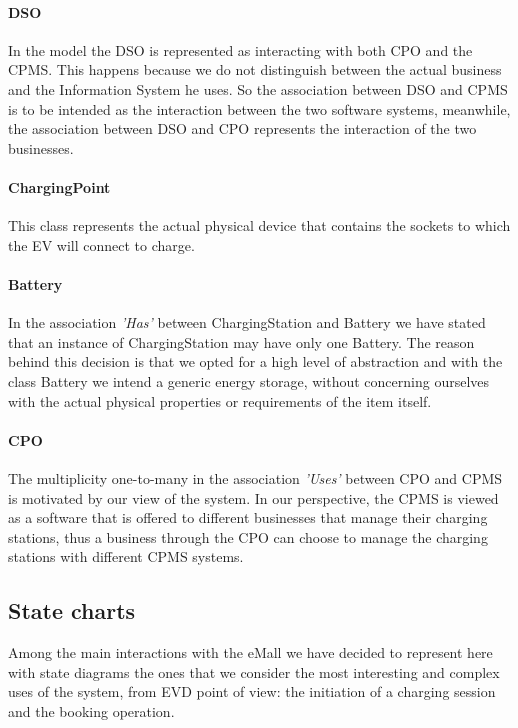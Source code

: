 \paragraph{DSO}
In the model the DSO is represented as interacting with both CPO and the CPMS. This happens because we do not distinguish between the actual business and the Information System he uses. So the association between DSO and CPMS is to be intended as the interaction between the two software systems, meanwhile, the association between DSO and CPO represents the interaction of the two businesses.

\paragraph{ChargingPoint}
This class represents the actual physical device that contains the sockets to which the EV will connect to charge.

\paragraph{Battery} In the association \textit{'Has'} between ChargingStation and Battery we have stated that an instance of ChargingStation may have only one Battery. The reason behind this decision is that we opted for a high level of abstraction and with the class Battery we intend a generic energy storage, without concerning ourselves with the actual physical properties or requirements of the item itself.

\paragraph{CPO} The multiplicity one-to-many in the association \textit{'Uses'} between CPO and CPMS is motivated by our view of the system. In our perspective, the CPMS is viewed as a software that is offered to different businesses that manage their charging stations, thus a business through the CPO can choose to manage the charging stations with different CPMS systems.

\subsection{State charts}
Among the main interactions with the eMall we have decided to represent here with state diagrams the ones that we consider the most interesting and complex uses of the system, from EVD point of view: the initiation of a charging session and the booking operation.

